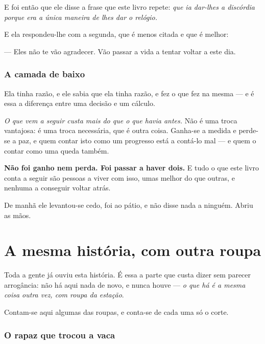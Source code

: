 \documentclass[livro.tex]{subfiles}
\begin{document}
\medskip

E foi então que ele disse a frase que este livro repete: \emph{que ia dar-lhes a discórdia porque
era a única maneira de lhes dar o relógio.}

\medskip

E ela respondeu-lhe com a segunda, que é menos citada e que é melhor:

\medskip

--- Eles não te vão agradecer. Vão passar a vida a tentar voltar a este dia.

\subsection*{A camada de baixo}

Ela tinha razão, e ele sabia que ela tinha razão, e fez o que fez na mesma --- e é essa a
diferença entre uma decisão e um cálculo.

\medskip

\emph{O que vem a seguir custa mais do que o que havia antes.} Não é uma troca vantajosa: é uma
troca necessária, que é outra coisa. Ganha-se a medida e perde-se a paz, e quem contar isto como
um progresso está a contá-lo mal --- e quem o contar como uma queda também.

\medskip

\textbf{Não foi ganho nem perda. Foi passar a haver dois.} E tudo o que este livro conta a seguir
são pessoas a viver com isso, umas melhor do que outras, e nenhuma a conseguir voltar atrás.

\medskip

De manhã ele levantou-se cedo, foi ao pátio, e não disse nada a ninguém. Abriu as mãos.


\chapter{A mesma história, com outra roupa}

Toda a gente já ouviu esta história. É essa a parte que custa dizer sem parecer arrogância: não há
aqui nada de novo, e nunca houve --- \emph{o que há é a mesma coisa outra vez, com roupa da
estação}.

\medskip

Contam-se aqui algumas das roupas, e conta-se de cada uma só o corte.

\subsection*{O rapaz que trocou a vaca}
\end{document}
